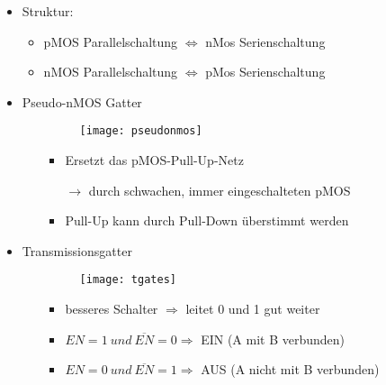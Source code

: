 \begin{itemize}
\begin{itemize}
		\item Struktur: 
			\begin{itemize}
			\item pMOS Parallelschaltung $\Leftrightarrow$ nMos Serienschaltung
			\item nMOS Parallelschaltung $\Leftrightarrow$ pMos Serienschaltung
			\end{itemize}
		
		\item Pseudo-nMOS Gatter
			\begin{itemize}
			\item[]		
				\begin{minipage}{0.25\textwidth}
					\begin{figure}[H]
					\texttt{[image: pseudonmos]}
					\end{figure}
				\end{minipage}
				\begin{minipage}[t]{0.6\textwidth}
					\vspace{-1.25cm}
					\begin{itemize}
					\item Ersetzt das pMOS-Pull-Up-Netz
					\item[$\rightarrow$] durch schwachen, immer eingeschalteten pMOS
					\item Pull-Up kann durch Pull-Down überstimmt werden
					\end{itemize}
				\end{minipage}
			\end{itemize}
		\item Transmissionsgatter
			\begin{itemize}
			\item[]		
				\begin{minipage}{0.25\textwidth}
					\begin{figure}[H]
					\texttt{[image: tgates]}
					\end{figure}
				\end{minipage}
				\begin{minipage}[t]{0.6\textwidth}
					\vspace{-1.25cm}
					\begin{itemize}
					\item besseres Schalter $\Rightarrow$ leitet 0 und 1 gut weiter
					\item $EN = 1 ~ und ~ \overline{EN}=0 \Rightarrow$ EIN (A mit B verbunden)
					\item $EN = 0 ~ und ~ \overline{EN}=1 \Rightarrow$ AUS (A nicht mit B verbunden)
					\end{itemize}
				\end{minipage}
			\end{itemize}
	\end{itemize}


\end{itemize}
